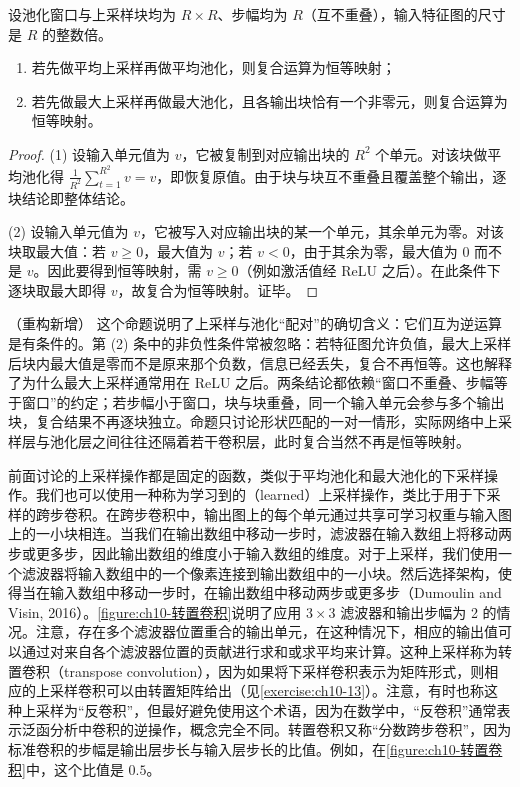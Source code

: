 \documentclass[../../main.tex]{subfiles}
\begin{document}
\begin{proposition}[上采样与池化的复合]\label{proposition:ch10-上采样复合}
设池化窗口与上采样块均为 $R\times R$、步幅均为 $R$（互不重叠），输入特征图的尺寸是 $R$ 的整数倍。
\begin{enumerate}
  \item 若先做平均上采样再做平均池化，则复合运算为恒等映射；
  \item 若先做最大上采样再做最大池化，且各输出块恰有一个非零元，则复合运算为恒等映射。
\end{enumerate}
\end{proposition}
\begin{proof}
(1) 设输入单元值为 $v$，它被复制到对应输出块的 $R^2$ 个单元。对该块做平均池化得 $\frac{1}{R^2}\sum_{t=1}^{R^2}v=v$，即恢复原值。由于块与块互不重叠且覆盖整个输出，逐块结论即整体结论。

(2) 设输入单元值为 $v$，它被写入对应输出块的某一个单元，其余单元为零。对该块取最大值：若 $v\geqslant0$，最大值为 $v$；若 $v<0$，由于其余为零，最大值为 $0$ 而不是 $v$。因此要得到恒等映射，需 $v\geqslant0$（例如激活值经 ReLU 之后）。在此条件下逐块取最大即得 $v$，故复合为恒等映射。证毕。
\end{proof}

\begin{remark}（重构新增）
这个命题说明了上采样与池化“配对”的确切含义：它们互为逆运算是有条件的。第 (2) 条中的非负性条件常被忽略：若特征图允许负值，最大上采样后块内最大值是零而不是原来那个负数，信息已经丢失，复合不再恒等。这也解释了为什么最大上采样通常用在 ReLU 之后。两条结论都依赖“窗口不重叠、步幅等于窗口”的约定；若步幅小于窗口，块与块重叠，同一个输入单元会参与多个输出块，复合结果不再逐块独立。命题只讨论形状匹配的一对一情形，实际网络中上采样层与池化层之间往往还隔着若干卷积层，此时复合当然不再是恒等映射。
\end{remark}

前面讨论的上采样操作都是固定的函数，类似于平均池化和最大池化的下采样操作。我们也可以使用一种称为学习到的（learned）上采样操作，类比于用于下采样的跨步卷积。在跨步卷积中，输出图上的每个单元通过共享可学习权重与输入图上的一小块相连。当我们在输出数组中移动一步时，滤波器在输入数组上将移动两步或更多步，因此输出数组的维度小于输入数组的维度。对于上采样，我们使用一个滤波器将输入数组中的一个像素连接到输出数组中的一小块。然后选择架构，使得当在输入数组中移动一步时，在输出数组中移动两步或更多步（Dumoulin and Visin, 2016）。\cref{figure:ch10-转置卷积}说明了应用 $3\times 3$ 滤波器和输出步幅为 2 的情况。注意，存在多个滤波器位置重合的输出单元，在这种情况下，相应的输出值可以通过对来自各个滤波器位置的贡献进行求和或求平均来计算。这种上采样称为转置卷积（transpose convolution），因为如果将下采样卷积表示为矩阵形式，则相应的上采样卷积可以由转置矩阵给出（见\cref{exercise:ch10-13}）。注意，有时也称这种上采样为“反卷积”，但最好避免使用这个术语，因为在数学中，“反卷积”通常表示泛函分析中卷积的逆操作，概念完全不同。转置卷积又称“分数跨步卷积”，因为标准卷积的步幅是输出层步长与输入层步长的比值。例如，在\cref{figure:ch10-转置卷积}中，这个比值是 $0.5$。
\end{document}
